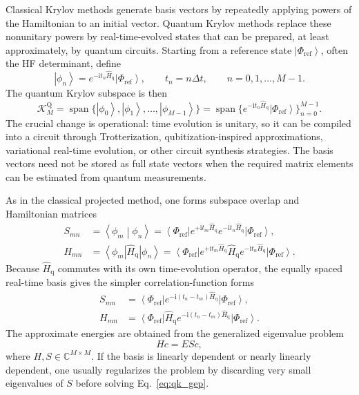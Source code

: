 \documentclass[11pt]{article}
\newcommand{\ii}{\mathrm{i}}
\newcommand{\ket}[1]{\left|#1\right\rangle}
\newcommand{\bra}[1]{\left\langle#1\right|}
\newcommand{\braket}[2]{\left\langle#1\middle|#2\right\rangle}
\begin{document}
Classical Krylov methods generate basis vectors by repeatedly applying powers of the Hamiltonian to an initial vector.  Quantum Krylov methods replace these nonunitary powers by real-time-evolved states that can be prepared, at least approximately, by quantum circuits.  Starting from a reference state $\ket{\Phi_{\mathrm{ref}}}$, often the HF determinant, define
\begin{equation}
    \ket{\phi_n}=e^{-\ii t_n\hat{H}_{\mathrm{q}}}\ket{\Phi_{\mathrm{ref}}},
    \qquad t_n=n\Delta t,
    \qquad n=0,1,\ldots,M-1.
\end{equation}
The quantum Krylov subspace is then
\begin{equation}
    \mathcal{K}^{\mathrm{Q}}_M
    = \operatorname{span}\{\ket{\phi_0},\ket{\phi_1},\ldots,\ket{\phi_{M-1}}\}
    = \operatorname{span}\{e^{-\ii t_n\hat{H}_{\mathrm{q}}}\ket{\Phi_{\mathrm{ref}}}\}_{n=0}^{M-1}.
\end{equation}
The crucial change is operational: time evolution is unitary, so it can be compiled into a circuit through Trotterization, qubitization-inspired approximations, variational real-time evolution, or other circuit synthesis strategies.  The basis vectors need not be stored as full state vectors when the required matrix elements can be estimated from quantum measurements.

As in the classical projected method, one forms subspace overlap and Hamiltonian matrices
\begin{align}
    S_{mn}
    &= \braket{\phi_m}{\phi_n}
    = \bra{\Phi_{\mathrm{ref}}}
    e^{+\ii t_m\hat{H}_{\mathrm{q}}}
    e^{-\ii t_n\hat{H}_{\mathrm{q}}}
    \ket{\Phi_{\mathrm{ref}}}, \\
    H_{mn}
    &= \bra{\phi_m}\hat{H}_{\mathrm{q}}\ket{\phi_n}
    = \bra{\Phi_{\mathrm{ref}}}
    e^{+\ii t_m\hat{H}_{\mathrm{q}}}
    \hat{H}_{\mathrm{q}}
    e^{-\ii t_n\hat{H}_{\mathrm{q}}}
    \ket{\Phi_{\mathrm{ref}}}.
    \label{eq:qk_h_s_general}
\end{align}
Because $\hat{H}_{\mathrm{q}}$ commutes with its own time-evolution operator, the equally spaced real-time basis gives the simpler correlation-function forms
\begin{align}
    S_{mn}
    &= \bra{\Phi_{\mathrm{ref}}}e^{-\ii (t_n-t_m)\hat{H}_{\mathrm{q}}}\ket{\Phi_{\mathrm{ref}}}, \\
    H_{mn}
    &= \bra{\Phi_{\mathrm{ref}}}\hat{H}_{\mathrm{q}}
    e^{-\ii (t_n-t_m)\hat{H}_{\mathrm{q}}}\ket{\Phi_{\mathrm{ref}}}.
    \label{eq:qk_h_s_stationary}
\end{align}
The approximate energies are obtained from the generalized eigenvalue problem
\begin{equation}
    Hc = ESc,
    \label{eq:qk_gep}
\end{equation}
where $H,S\in\mathbb{C}^{M\times M}$.  If the basis is linearly dependent or nearly linearly dependent, one usually regularizes the problem by discarding very small eigenvalues of $S$ before solving Eq.~\eqref{eq:qk_gep}.
\end{document}
